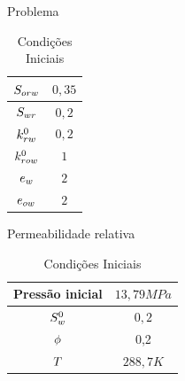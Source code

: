 \documentclass[professionalfont]{beamer}
\begin{document}
\begin{frame}{Problema \theproblem}
    \fboxrule=0pt
\renewcommand{\arraystretch}{1.2}
\setlength{\tabcolsep}{5pt}
\setlength{\extrarowheight}{2pt}
\begin{table}[!ht]
    \small
    \centering
    \begin{subtable}[t]{0.48\textwidth}
        \centering
        \begin{tabular}{|c|c|}
            \hline
            $S_{o r w}$ & $0,35$ \\
            \hline
            $S_{w r}$ & $0,2$ \\
            \hline
            $k_{r w}^{0}$ & $0,2$ \\
            \hline
            $k_{r o w}^{0}$ & $1$ \\
            \hline
            $e_{w}$ & $2$ \\
            \hline
            $e_{o w}$ & $2$ \\
            \hline
        \end{tabular}
        \caption{Permeabilidade relativa}
    \end{subtable}
    \hspace{\fill}
    \begin{subtable}{0.48\textwidth}
        \centering
        \begin{tabular}{|c|c|}
            \hline
            Pressão inicial & $13,79MPa$ \\
            \hline
            $S_{w}^{0}$ & $0,2$ \\
            \hline
            $\phi$ & 0,2 \\
            \hline
            $T$ & $288,7 K$ \\
            \hline
        \end{tabular}
        \caption{Condições Iniciais}
        \label{tab:table_prob4.b}
    \end{subtable}
\end{table}

\end{frame}
\end{document}
